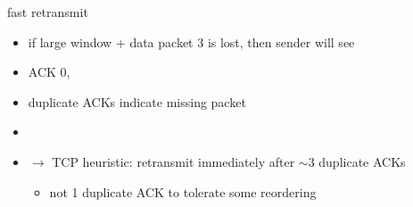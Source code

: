\begin{frame}{fast retransmit}
    \begin{itemize}
    \item if large window + data packet 3 is lost, then sender will see
    \item ACK 0, 
    \item duplicate ACKs indicate missing packet
    \item {}
    \vspace{.5cm}
    \item<2-> $\rightarrow$ TCP heuristic: retransmit immediately after $\sim$3 duplicate ACKs
        \begin{itemize}
        \item not 1 duplicate ACK to tolerate some reordering
        \end{itemize}
    \end{itemize}
\end{frame}

